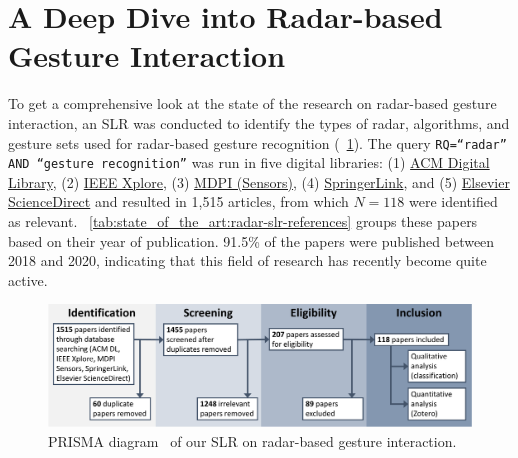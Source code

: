 \section{A Deep Dive into Radar-based Gesture Interaction} \label{sec:state_of_the_art:radar}

To get a comprehensive look at the state of the research on radar-based gesture interaction, an SLR was conducted to identify the types of radar, algorithms, and gesture sets used for radar-based gesture recognition (\fig~\ref{fig:state_of_the_art:radar:prisma}). The query \texttt{RQ=``radar'' AND ``gesture recognition''} was run in five digital libraries: (1) \href{https://dl.acm.org/}{ACM Digital Library}, (2) \href{https://ieeexplore.ieee.org/Xplore/home.jsp}{IEEE Xplore}, (3) \href{https://www.mdpi.com/journal/sensors}{MDPI (Sensors)}, (4) \href{https://link.springer.com/}{SpringerLink}, and (5) \href{https://www.sciencedirect.com/}{Elsevier ScienceDirect} and resulted in 1,515 articles, from which $N=118$ were identified as relevant. \tab~\ref{tab:state_of_the_art:radar-slr-references} groups these papers based on their year of publication. 91.5\% of the papers were published between 2018 and 2020, indicating that this field of research has recently become quite active. 

\begin{figure}[hbt]
    \centering
    \includegraphics[width=\linewidth]{Figures/StateOfTheArt/Radar/PRISMA-Radar.pdf}
    \caption{PRISMA diagram~\cite{Page:2021} of our SLR on radar-based gesture interaction.}
    \label{fig:state_of_the_art:radar:prisma}
\end{figure}

